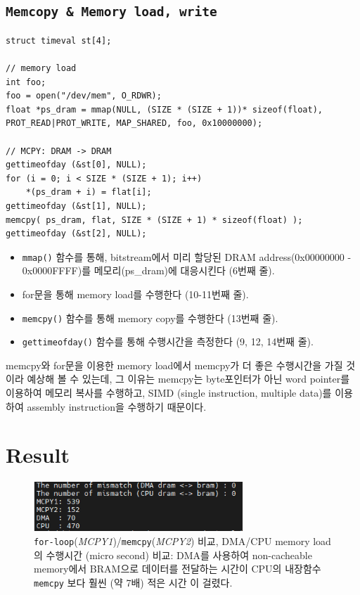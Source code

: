 \documentclass{article}
\begin{document}
\newpage
\subsection*{\texttt{Memcopy \& Memory load, write}}
\begin{lstlisting}[style={c-style}]
struct timeval st[4];

// memory load
int foo;
foo = open("/dev/mem", O_RDWR);
float *ps_dram = mmap(NULL, (SIZE * (SIZE + 1))* sizeof(float), PROT_READ|PROT_WRITE, MAP_SHARED, foo, 0x10000000);

// MCPY: DRAM -> DRAM
gettimeofday (&st[0], NULL);
for (i = 0; i < SIZE * (SIZE + 1); i++)
    *(ps_dram + i) = flat[i];
gettimeofday (&st[1], NULL);
memcpy( ps_dram, flat, SIZE * (SIZE + 1) * sizeof(float) );
gettimeofday (&st[2], NULL);
\end{lstlisting}
\begin{itemize}
  \setlength\itemsep{-0.5em}
    \item  \texttt{mmap()} 함수를 통해, bitstream에서 미리 할당된 DRAM address(0x00000000 - 0x0000FFFF)를 메모리(ps\_dram)에 대응시킨다 (6번째 줄).
    \item for문을 통해 memory load를 수행한다 (10-11번째 줄).
    \item  \texttt{memcpy()} 함수를 통해 memory copy를 수행한다 (13번째 줄).
    \item  \texttt{gettimeofday()} 함수를 통해 수행시간을 측정한다 (9, 12, 14번째 줄).
\end{itemize}
memcpy와 for문을 이용한 memory load에서 memcpy가 더 좋은 수행시간을 가질 것이라 예상해 볼 수 있는데, 그 이유는 memcpy는 byte포인터가 아닌 word pointer를 이용하여 메모리 복사를 수행하고, SIMD (single instruction, multiple data)를 이용하여 assembly instruction을 수행하기 때문이다.

\section{Result}
\begin{figure}[htb!]
	\centering
	\includegraphics[width=0.7\textwidth]{fig/make2.png}
\caption{\texttt{for-loop}(\textit{MCPY1})/\texttt{memcpy}(\textit{MCPY2}) 비교, DMA/CPU memory load의 수행시간 (micro second) 비교: DMA를 사용하여 non-cacheable memory에서 BRAM으로 데이터를 전달하는 시간이 CPU의 내장함수 \texttt{memcpy} 보다 훨씬 (약 7배) 적은 시간 이 걸렸다.}
\label{fig6}
\end{figure}
\end{document}
